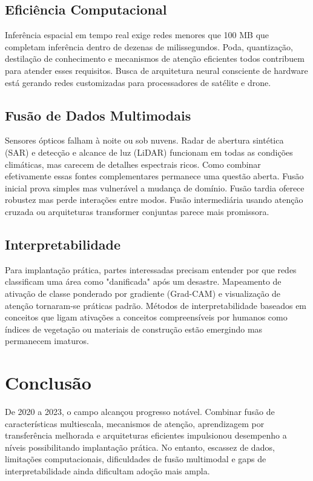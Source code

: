 \documentclass[12pt,a4paper]{article}
\begin{document}
\subsection{Eficiência Computacional}
Inferência espacial em tempo real exige redes menores que 100 MB que completam inferência dentro de dezenas de milissegundos. Poda, quantização, destilação de conhecimento e mecanismos de atenção eficientes todos contribuem para atender esses requisitos. Busca de arquitetura neural consciente de hardware está gerando redes customizadas para processadores de satélite e drone.

\subsection{Fusão de Dados Multimodais}
Sensores ópticos falham à noite ou sob nuvens. Radar de abertura sintética (SAR) e detecção e alcance de luz (LiDAR) funcionam em todas as condições climáticas, mas carecem de detalhes espectrais ricos. Como combinar efetivamente essas fontes complementares permanece uma questão aberta. Fusão inicial prova simples mas vulnerável a mudança de domínio. Fusão tardia oferece robustez mas perde interações entre modos. Fusão intermediária usando atenção cruzada ou arquiteturas transformer conjuntas parece mais promissora.

\subsection{Interpretabilidade}
Para implantação prática, partes interessadas precisam entender por que redes classificam uma área como "danificada" após um desastre. Mapeamento de ativação de classe ponderado por gradiente (Grad-CAM) e visualização de atenção tornaram-se práticas padrão. Métodos de interpretabilidade baseados em conceitos que ligam ativações a conceitos compreensíveis por humanos como índices de vegetação ou materiais de construção estão emergindo mas permanecem imaturos.

\section{Conclusão}
\label{sec:conclusion}
De 2020 a 2023, o campo alcançou progresso notável. Combinar fusão de características multiescala, mecanismos de atenção, aprendizagem por transferência melhorada e arquiteturas eficientes impulsionou desempenho a níveis possibilitando implantação prática. No entanto, escassez de dados, limitações computacionais, dificuldades de fusão multimodal e gaps de interpretabilidade ainda dificultam adoção mais ampla.
\end{document}
